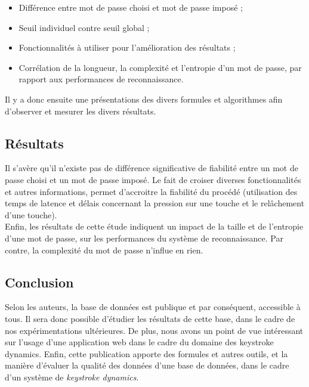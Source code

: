 \begin{itemize}
\item Différence entre mot de passe choisi et mot de passe imposé ;
\item Seuil individuel contre seuil global ;
\item Fonctionnalités à utiliser pour l'amélioration des résultats ;
\item Corrélation de la longueur, la complexité et l'entropie d'un mot de passe, par rapport aux performances de reconnaissance.\\
\end{itemize}

Il y a donc ensuite une présentations des divers formules et algorithmes afin d'observer et mesurer les divers résultats.

\subsection{Résultats}

Il s'avère qu'il n'existe pas de différence significative de fiabilité entre un mot de passe choisi et un mot de passe imposé. Le fait de croiser diverses fonctionnalités et autres informations, permet d'accroitre la fiabilité du procédé (utilisation des temps de latence et délais concernant la pression sur une touche et le relâchement d'une touche).\\

Enfin, les résultats de cette étude indiquent un impact de la taille et de l'entropie d'une mot de passe, sur les performances du système de reconnaissance. Par contre, la complexité du mot de passe n'influe en rien.

\subsection{Conclusion}

Selon les auteurs, la base de données est publique et par conséquent, accessible à tous. Il sera donc possible d'étudier les résultats de cette base, dans le cadre de nos expérimentations ultérieures. De plus, nous avons un point de vue intéressant sur l'usage d'une application web dans le cadre du domaine des keystroke dynamics. Enfin, cette publication apporte des formules et autres outils, et la manière d'évaluer la qualité des données d'une base de données, dans le cadre d'un système de \textit{keystroke dynamics}.
